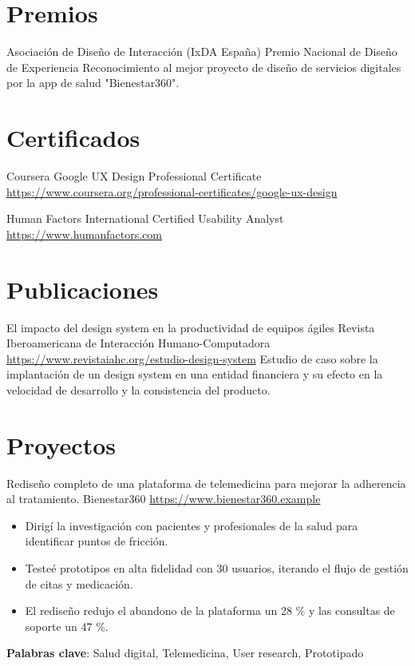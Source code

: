 \documentclass[a4paper, serif, 10pt]{moderncv}
\begin{document}
\section{Premios}

        {Asociación de Diseño de Interacción (IxDA España)}
        {Premio Nacional de Diseño de Experiencia}
        {}
        {}
        {Reconocimiento al mejor proyecto de diseño de servicios digitales por la app de salud "Bienestar360".}
\section{Certificados}

        {Coursera}
        {Google UX Design Professional Certificate}
        {\url{https://www.coursera.org/professional-certificates/google-ux-design}}
        {}
        {}

        {Human Factors International}
        {Certified Usability Analyst}
        {\url{https://www.humanfactors.com}}
        {}
        {}
\section{Publicaciones}

        {El impacto del design system en la productividad de equipos ágiles}
        {Revista Iberoamericana de Interacción Humano-Computadora}
        {\url{https://www.revistaiahc.org/estudio-design-system}}
        {}
        {Estudio de caso sobre la implantación de un design system en una entidad financiera y su efecto en la velocidad de desarrollo y la consistencia del producto.}
\section{Proyectos}

        {Rediseño completo de una plataforma de telemedicina para mejorar la adherencia al tratamiento.}
        {Bienestar360}
        {\url{https://www.bienestar360.example}}
        {}
        {\begin{itemize}
\item Dirigí la investigación con pacientes y profesionales de la salud para identificar puntos de fricción.
\item Testeé prototipos en alta fidelidad con 30 usuarios, iterando el flujo de gestión de citas y medicación.
\item El rediseño redujo el abandono de la plataforma un 28 \% y las consultas de soporte un 47 \%.
\end{itemize}
\textbf{Palabras clave}: Salud digital, Telemedicina, User research, Prototipado}
\end{document}

